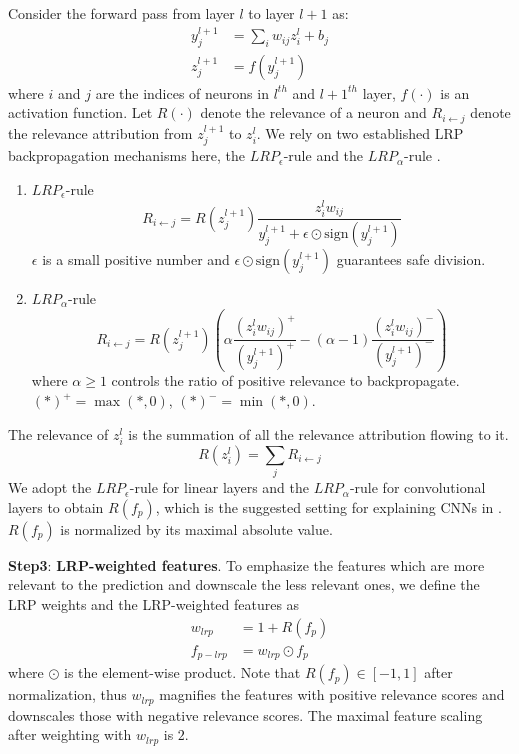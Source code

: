 \documentclass[a4paper,conference]{IEEEtran}
\begin{document}
Consider the forward pass from layer $l$ to layer $l+1$ as:
\begin{equation}
    \begin{aligned}
        y^{l+1}_j &=  \sum_i w_{ij}z^l_i + b_j\\
        z^{l+1}_j &=f(y^{l+1}_j)
    \end{aligned}
\end{equation}
where $i$ and $j$ are the indices of neurons in $l^{th}$ and $l+1^{th}$ layer, $f(\cdot)$ is an activation function. Let $R(\cdot)$ denote the relevance of a neuron and $R_{i\leftarrow j}$ denote the relevance attribution from $z^{l+1}_j$ to $z^l_i$.  We rely on two established LRP backpropagation mechanisms here, the $LRP_{\epsilon}$-rule and the $LRP_{\alpha}$-rule \cite{LRP:bach2015pixel}.
\begin{enumerate}
    \item $LRP_{\epsilon}$-rule
\begin{equation}
R_{i \leftarrow j} = R(z^{l+1}_j)\frac{z^l_iw_{ij}}{y^{l+1}_j + \epsilon \odot \mathrm{sign}(y^{l+1}_j)}
\end{equation}
$\epsilon$ is a small positive number and $\epsilon \odot  \mathrm{sign}(y^{l+1}_j)$ guarantees safe division.
\item $LRP_{\alpha}$-rule
\begin{equation}
    R_{i \leftarrow j} = R(z^{l+1}_j)\left(\alpha\frac{(z^l_iw_{ij})^+}{(y^{l+1}_j)^+}-(\alpha-1)\frac{(z^l_iw_{ij})^-}{(y^{l+1}_j)^-}\right)
\end{equation}
where $\alpha \geqslant 1$ controls the ratio of positive relevance to backpropagate. 
$(\ast)^+=\max(\ast,0)$, $(\ast)^-=\min(\ast,0)$.  
\end{enumerate}
The relevance of $z^l_i$ is the summation of all the relevance attribution flowing to it.
\begin{equation}
    R(z^l_i)=\sum_jR_{i\leftarrow j}
\end{equation}
We adopt the $LRP_{\epsilon}$-rule for linear layers and the $LRP_{\alpha}$-rule for convolutional layers to obtain $R(f_p)$, which is the suggested setting for explaining CNNs in \cite{SebasIJCNN2020:kohlbrenner2019towards}.
$R(f_p)$ is normalized by its maximal absolute value.

\textbf{Step3}: \textbf{LRP-weighted features}.
To emphasize the features which are more relevant to the prediction and downscale the less relevant ones, we define the LRP weights and the LRP-weighted features as
\begin{align}
    w_{lrp} &= 1 + R(f_p)\\
    f_{p-lrp} &= w_{lrp} \odot f_p
\end{align}
where $\odot$ is the element-wise product. Note that $R(f_p) \in [-1,1]$ after normalization, thus $w_{lrp}$ magnifies the features with positive relevance scores and downscales those with negative relevance scores. The maximal feature scaling after weighting with $w_{lrp}$ is $2$.
\end{document}
